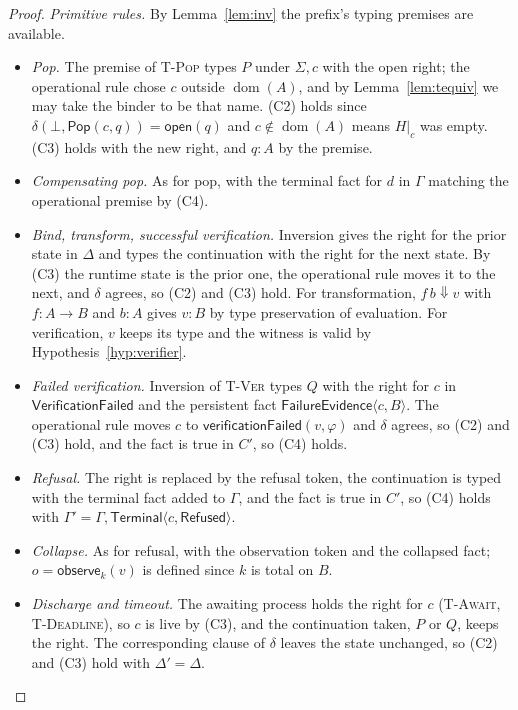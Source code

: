 \documentclass[11pt,openany]{book}
\theoremstyle{remark}
\newcommand{\Pop}{\mathsf{Pop}}
\newcommand{\dom}{\operatorname{dom}}
\begin{document}
\begin{proof}
\emph{Primitive rules.} By Lemma~\ref{lem:inv} the prefix's typing
premises are available.
\begin{itemize}[leftmargin=1.5em]
\item \emph{Pop.} The premise of \textsc{T-Pop} types $P$ under
$\Sigma,c$ with the open right; the operational rule chose $c$ outside
$\dom(A)$, and by Lemma~\ref{lem:tequiv} we may take the binder to be that
name. (C2) holds since $\delta(\bot,\Pop(c,q))=\mathsf{open}(q)$ and
$c\notin\dom(A)$ means $H|_c$ was empty. (C3) holds with the new right,
and $q:A$ by the premise.
\item \emph{Compensating pop.} As for pop, with the terminal fact for $d$
in $\Gamma$ matching the operational premise by (C4).
\item \emph{Bind, transform, successful verification.} Inversion gives
the right for the prior state in $\Delta$ and types the continuation with
the right for the next state. By (C3) the runtime state is the prior one,
the operational rule moves it to the next, and $\delta$ agrees, so (C2)
and (C3) hold. For transformation, $f\,b\Downarrow v$ with $f:A\to B$ and
$b:A$ gives $v:B$ by type preservation of evaluation. For verification,
$v$ keeps its type and the witness is valid by
Hypothesis~\ref{hyp:verifier}.
\item \emph{Failed verification.} Inversion of \textsc{T-Ver} types $Q$
with the right for $c$ in $\mathsf{VerificationFailed}$ and the persistent
fact $\mathsf{FailureEvidence}\langle c,B\rangle$. The operational rule
moves $c$ to $\mathsf{verificationFailed}(v,\varphi)$ and $\delta$ agrees,
so (C2) and (C3) hold, and the fact is true in $C'$, so (C4) holds.
\item \emph{Refusal.} The right is
replaced by the refusal token, the continuation is typed with the terminal
fact added to $\Gamma$, and the fact is true in $C'$, so (C4) holds with
$\Gamma'=\Gamma,\mathsf{Terminal}\langle c,\mathsf{Refused}\rangle$.
\item \emph{Collapse.} As for refusal, with the observation token and the
collapsed fact; $o=\mathsf{observe}_k(v)$ is defined since $k$ is total
on $B$.
\item \emph{Discharge and timeout.} The awaiting process holds the right
for $c$ (\textsc{T-Await}, \textsc{T-Deadline}), so $c$ is live by (C3),
and the continuation taken, $P$ or $Q$, keeps the right. The corresponding
clause of $\delta$ leaves the state unchanged, so (C2) and (C3) hold with
$\Delta'=\Delta$.
\end{itemize}


\end{proof}
\end{document}
